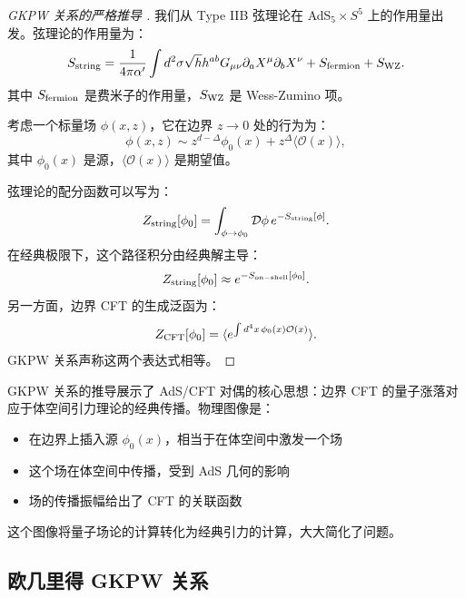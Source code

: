 \begin{proof}[GKPW 关系的严格推导 \cite{Maldacena1998}]
我们从 Type IIB 弦理论在 AdS$_5 \times S^5$ 上的作用量出发。弦理论的作用量为：
\begin{equation}
    S_{\rm string} = \frac{1}{4\pi\alpha'} \int d^2\sigma \sqrt{h} h^{ab} G_{\mu\nu} \partial_a X^\mu \partial_b X^\nu + S_{\rm fermion} + S_{\rm WZ}.
\end{equation}
其中 $S_{\rm fermion}$ 是费米子的作用量，$S_{\rm WZ}$ 是 Wess-Zumino 项。

考虑一个标量场 $\phi(x, z)$，它在边界 $z \to 0$ 处的行为为：
\begin{equation}
    \phi(x, z) \sim z^{d-\Delta} \phi_0(x) + z^\Delta \langle \mathcal{O}(x) \rangle,
\end{equation}
其中 $\phi_0(x)$ 是源，$\langle \mathcal{O}(x) \rangle$ 是期望值。

弦理论的配分函数可以写为：
\begin{equation}
    Z_{\rm string}[\phi_0] = \int_{\phi \to \phi_0} \mathcal{D}\phi \, e^{-S_{\rm string}[\phi]}.
\end{equation}
在经典极限下，这个路径积分由经典解主导：
\begin{equation}
    Z_{\rm string}[\phi_0] \approx e^{-S_{\rm on-shell}[\phi_0]}.
\end{equation}
另一方面，边界 CFT 的生成泛函为：
\begin{equation}
    Z_{\rm CFT}[\phi_0] = \langle e^{\int d^4 x \, \phi_0(x) \mathcal{O}(x)} \rangle.
\end{equation}
GKPW 关系声称这两个表达式相等。
\end{proof}

\begin{remark}
GKPW 关系的推导展示了 AdS/CFT 对偶的核心思想：边界 CFT 的量子涨落对应于体空间引力理论的经典传播。物理图像是：
\begin{itemize}
    \item 在边界上插入源 $\phi_0(x)$，相当于在体空间中激发一个场
    \item 这个场在体空间中传播，受到 AdS 几何的影响
    \item 场的传播振幅给出了 CFT 的关联函数
\end{itemize}
这个图像将量子场论的计算转化为经典引力的计算，大大简化了问题。
\end{remark}

\subsection{欧几里得 GKPW 关系}

